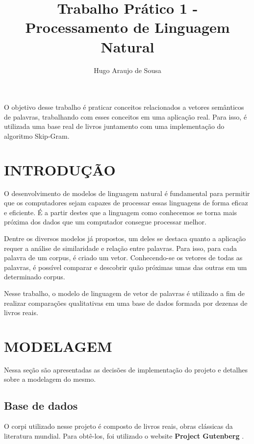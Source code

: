 \documentclass[12pt]{article}
\title{Trabalho Prático 1 - Processamento de Linguagem Natural}
\author{Hugo Araujo de Sousa}
\begin{document}
 

\maketitle
     
\begin{resumo} 
  O objetivo desse trabalho é praticar conceitos relacionados a vetores semânticos
  de palavras, trabalhando com esses conceitos em uma aplicação real. Para isso,
  é utilizada uma base real de livros juntamento com uma implementação do algoritmo
  Skip-Gram.
\end{resumo}

\section{INTRODUÇÃO}

O desenvolvimento de modelos de linguagem natural é fundamental para permitir que os
computadores sejam capazes de processar essas linguagens de forma eficaz e eficiente.
É a partir destes que a linguagem como conhecemos se torna mais próxima dos dados que
um computador consegue processar melhor.

Dentre os diversos modelos já propostos, um deles se destaca quanto a aplicação requer
a análise de similaridade e relação entre palavras. Para isso, para cada palavra de um
corpus, é criado um vetor. Conhecendo-se os vetores de todas as palavras, é possível
comparar e descobrir quão próximas umas das outras em um determinado corpus.

Nesse trabalho, o modelo de linguagem de vetor de palavras é utilizado a fim de realizar
comparações qualitativas em uma base de dados formada por dezenas de livros reais.

\section{MODELAGEM}

Nessa seção são apresentadas as decisões de implementação do projeto e detalhes sobre a modelagem
do mesmo.

\subsection{Base de dados}

O corpi utilizado nesse projeto é composto de livros reais, obras clássicas da literatura mundial.
Para obtê-los, foi utilizado o website \textbf{Project Gutenberg} \cite{gberg}.
\end{document}
